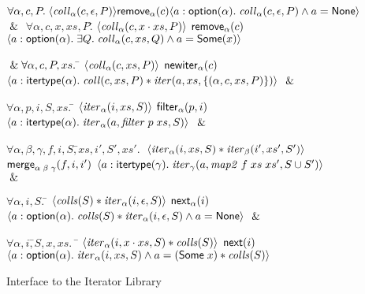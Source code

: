 \begin{figure}
\begin{specification}

\> $\forall \alpha, c, P.\; \langle{\mathit{coll}_\alpha(c, \epsilon, P)}\rangle{{\mathsf{remove}_\alpha(c)}}\langle{a:\mathsf{option }{(\alpha)}}.\;{\mathit{coll}_\alpha(c, \epsilon, P) \land a = \mathsf{None}}\rangle$
$\;\&\;$ 
\> $\forall \alpha, c, x, xs, P.$\=
          $\left<{\mathit{coll}_\alpha(c, x\cdot xs, P)}\right>$ 
\nextline
\>\> ${\mathsf{remove}_\alpha(c)}$ 
\nextline
\>\> $\left<{a:\mathsf{option }{(\alpha)}.\;
             \exists Q.\;\mathit{coll}_\alpha(c, xs, Q) \land a = \mathsf{Some}(x)}\right>$ 

\> $\;\&\; \forall \alpha, c, P, xs.\;$\=
            $\left<{\mathit{coll}_\alpha(c, xs, P)}\right>$ 
\nextline
\>\>${\mathsf{newiter}_\alpha(c)}$
\nextline
\>\>$\left<{a:\mathsf{itertype}(\alpha).\; \mathit{coll}(c, xs, P) * \mathit{iter}(a, xs, \{{(\alpha, c, xs, P)}\})}\right>$ $\;\&\;$ 

 \> $\forall \alpha, p, i, S, xs.\;$\=
         $\left<{\mathit{iter}_\alpha(i, xs, S)}\right>$ 
\nextline
\>\>   ${\mathsf{filter}_\alpha(p, i)}$
\nextline
\>\>   $\left<{a:\mathsf{itertype}(\alpha).\; \mathit{iter}_\alpha(a, \mathit{filter}\; p\;xs, S)}\right>$ $\;\&\;$ 

 \> $\forall \alpha, \beta, \gamma, f, i, S,$\=$ xs, i', S', xs'.\;$ 
\nextline
 \> \> 
     $\left<{\mathit{iter}_\alpha(i, xs, S) * \mathit{iter}_\beta(i', xs', S')}\right>$ %
\nextline
 \> \> ${\mathsf{merge}_{\alpha\;\beta\;\gamma}(f, i, i')}$ 
\nextline
 \> \> $\left<{a:\mathsf{itertype}(\gamma).\; \mathit{iter}_{\gamma}(a, \mathit{map2}\;f\;xs\;xs', S \cup S')}\right>$ $\;\&\;$ 

 \> $\forall \alpha, i, S.\;$\=
      $\left<{\mathit{colls}(S) * \mathit{iter}_\alpha(i, \epsilon, S)}\right>$
\nextline  
\>\>${\mathsf{next}_\alpha(i)}$ 
\nextline
\>\>$\left<{a:\mathsf{option }{(\alpha)}.\; \mathit{colls}(S) * \mathit{iter}_\alpha(i, \epsilon, S) \land a = \mathsf{None}}\right>$ $\;\&\;$ 

 \> $\forall \alpha, i, $\=$ S, x, xs.\;$ \= 
      $\left<{\mathit{iter}_\alpha(i, x \cdot xs, S) * \mathit{colls}(S)}\right>$
\nextline
\>\>\>${\mathsf{next}(i)}$
\nextline
\>\>\>$\left<{a:\mathsf{option }{(\alpha)}.\; 
              \mathit{iter}_\alpha(i, xs, S) \land a = (\mathsf{Some}\;x) * \mathit{colls}(S)}\right>$ 

\end{specification}
\caption{Interface to the Iterator Library}
\label{iterator-interface}
\end{figure}



